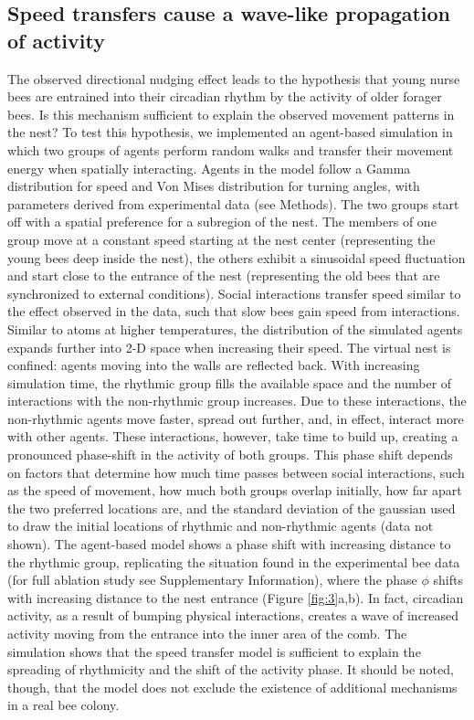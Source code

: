 \documentclass{article}
\newcommand{\added}[1]{{\color{blue}#1}}
\newcommand{\added}[1]{#1}
\begin{document}
\subsection{Speed transfers cause a wave-like propagation of activity}
The observed directional nudging effect leads to the hypothesis that young nurse bees are entrained into their circadian rhythm by the activity of older forager bees. Is this mechanism sufficient to explain the observed movement patterns in the nest? To test this hypothesis, we implemented an agent-based simulation in which two groups of agents perform random walks and transfer their movement energy when spatially interacting. \added{Agents in the model follow a Gamma distribution for speed and Von Mises distribution for turning angles, with parameters derived from experimental data (see Methods).} The two groups start off with a spatial preference for a subregion of the nest. The members of one group move at a constant speed starting at the nest center (representing the young bees deep inside the nest), the others exhibit a sinusoidal speed fluctuation and start close to the entrance of the nest (representing the old bees that are synchronized to external conditions). Social interactions transfer speed similar to the effect observed in the data, such that slow bees gain speed from interactions. Similar to atoms at higher temperatures, the distribution of the simulated agents expands further into 2-D space when increasing their speed. The virtual nest is confined: agents moving into the walls are reflected back. With increasing simulation time, the rhythmic group fills the available space and the number of interactions with the non-rhythmic group increases. Due to these interactions, the non-rhythmic agents move faster, spread out further, and, in effect, interact more with other agents. These interactions, however, take time to build up, creating a pronounced phase-shift in the activity of both groups. This phase shift depends on factors that determine how much time passes between social interactions, such as the speed of movement, how much both groups overlap initially, how far apart the two preferred locations are, and the standard deviation of the gaussian used to draw the initial locations of rhythmic and non-rhythmic agents (data not shown). The agent-based model shows a phase shift with increasing distance to the rhythmic group, replicating the situation found in the experimental bee data \added{(for full ablation study see Supplementary Information)}, where the phase $\phi$ shifts with increasing distance to the nest entrance (Figure \ref{fig:3}a,b). In fact, circadian activity, as a result of bumping physical interactions, creates a wave of increased activity moving from the entrance into the inner area of the comb. The simulation shows that the speed transfer model is sufficient to explain the spreading of rhythmicity and the shift of the activity phase. It should be noted, though, that the model does not exclude the existence of additional mechanisms in a real bee colony. 
\end{document}
